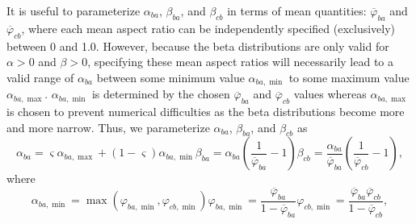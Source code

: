 \documentclass[amt, manuscript]{copernicus}
\begin{document}


It is useful to parameterize $\alpha_{ba}$, $\beta_{ba}$, and $\beta_{cb}$ in terms of mean quantities: $\overline{\varphi}_{ba}$ and $\overline{\varphi}_{cb}$, where each mean aspect ratio can be independently specified (exclusively) between 0 and 1.0. However, because the beta distributions are only valid for $\alpha >0$ and $\beta > 0$, specifying these mean aspect ratios will necessarily lead to a valid range of $\alpha_{ba}$ between some minimum value $\alpha_{ba,\min}$ to some maximum value $\alpha_{ba,\max}$. $\alpha_{ba,\min}$ is determined by the chosen $\overline{\varphi}_{ba}$ and $\overline{\varphi}_{cb}$ values whereas $\alpha_{ba,\max}$ is chosen to prevent numerical difficulties as the beta distributions become more and more narrow. Thus, we parameterize $\alpha_{ba}$, $\beta_{ba}$, and $\beta_{cb}$ as
\begin{subequations}\label{eq:ar_beta_params}
    \begin{equation}
        \alpha_{ba} = \varsigma \alpha_{ba,\max} + (1-\varsigma) \alpha_{ba,\min}
    \end{equation}
    \begin{equation}
        \beta_{ba} = \alpha_{ba} \left(\frac{1}{\overline{\varphi}_{ba}}-1 \right)
    \end{equation}
    \begin{equation}
        \beta_{cb} = \frac{\alpha_{ba}}{\overline{\varphi}_{ba}} \left( \frac{1}{\overline{\varphi}_{cb}} - 1\right), 
    \end{equation}
\end{subequations}
where 
\begin{subequations}
    \begin{equation}
        \alpha_{ba,\min} = \max(\varphi_{ba,\min},\varphi_{cb,\min})
    \end{equation}
    \begin{equation}
        \varphi_{ba,\min} = \frac{\overline{\varphi}_{ba}}{1-\overline{\varphi}_{ba}}
    \end{equation}
    \begin{equation}
        \varphi_{cb,\min} = \frac{\overline{\varphi}_{ba} \overline{\varphi}_{cb}}{1-\overline{\varphi}_{cb}},
    \end{equation}
\end{subequations}
\end{document}
